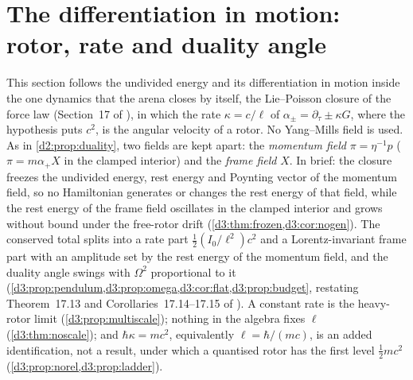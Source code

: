 \section{The differentiation in motion: rotor, rate and duality angle}
\label{d3:sec:main}

This section follows the undivided energy and its differentiation in motion inside the one dynamics that the arena closes by itself, the
Lie--Poisson closure of the force law (Section~17 of \cite{ES17}), in which the rate $\kappa=c/\ell$ of $\alpha_\pm=\partial_\tau\pm\kappa G$, where the
hypothesis puts $c^2$, is the angular velocity of a rotor. No Yang--Mills field is used. As in \cref{d2:prop:duality}, two fields are kept apart: the
\emph{momentum field} $\pi=\eta^{-1}p$ ($\pi=m\alpha_+X$ in the clamped interior) and the \emph{frame field} $X$. In brief: the closure freezes the
undivided energy, rest energy and Poynting vector of the momentum field, so no Hamiltonian generates or changes the rest energy of that field,
while the rest energy of the frame field oscillates in the clamped interior and grows without bound under the free-rotor drift
(\cref{d3:thm:frozen,d3:cor:nogen}). The conserved total splits into a rate part $\tfrac12(I_0/\ell^2)c^2$ and a Lorentz-invariant frame part with
an amplitude set by the rest energy of the momentum field, and the duality angle swings with $\Omega^2$ proportional to it
(\cref{d3:prop:pendulum,d3:prop:omega,d3:cor:flat,d3:prop:budget}, restating Theorem~17.13 and Corollaries~17.14--17.15 of \cite{ES17}). A constant
rate is the heavy-rotor limit (\cref{d3:prop:multiscale}); nothing in the algebra fixes $\ell$ (\cref{d3:thm:noscale}); and $\hbar\kappa=mc^2$,
equivalently $\ell=\hbar/(mc)$, is an added identification, not a result, under which a quantised rotor has the first level $\tfrac12mc^2$
(\cref{d3:prop:norel,d3:prop:ladder}).

